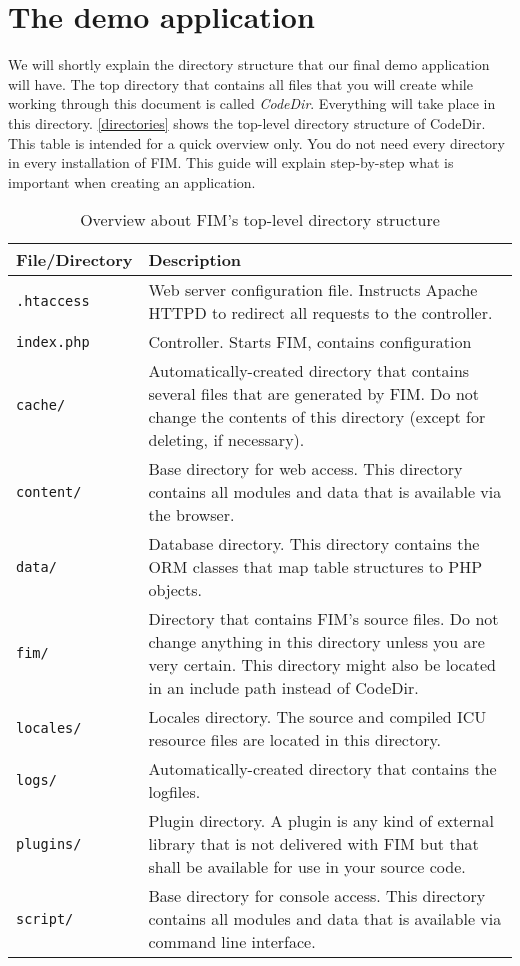 \documentclass{scrartcl}
\begin{document}
   \section{The demo application}
      We will shortly explain the directory structure that our final demo application will have. The top directory that contains all files that you will create while working through this document is called \emph{CodeDir}. Everything will take place in this directory. \autoref{directories} shows the top-level directory structure of CodeDir. This table is intended for a quick overview only. You do not need every directory in every installation of FIM. This guide will explain step-by-step what is important when creating an application.
      \begin{table}[htbp]
         \centering
         \begin{tabular}{p{2.5cm}||p{11.5cm}}
            File/Directory & Description \\\hline\hline
            \texttt{.htaccess} &
               Web server configuration file. Instructs Apache HTTPD to redirect all requests to the controller. \\\hline
            \texttt{index.php} &
               Controller. Starts FIM, contains configuration \\\hline
            \texttt{cache/} &
               Automatically-created directory that contains several files that are generated by FIM. Do not change the contents of this directory (except for deleting, if necessary). \\\hline
            \texttt{content/} &
               Base directory for web access. This directory contains all modules and data that is available via the browser. \\\hline
            \texttt{data/} &
               Database directory. This directory contains the ORM classes that map table structures to PHP objects. \\\hline
            \texttt{fim/} &
               Directory that contains FIM's source files. Do not change anything in this directory unless you are very certain. This directory might also be located in an include path instead of CodeDir. \\\hline
            \texttt{locales/} &
               Locales directory. The source and compiled ICU resource files are located in this directory. \\\hline
            \texttt{logs/} &
               Automatically-created directory that contains the logfiles. \\\hline
            \texttt{plugins/} &
               Plugin directory. A plugin is any kind of external library that is not delivered with FIM but that shall be available for use in your source code. \\\hline
            \texttt{script/} &
               Base directory for console access. This directory contains all modules and data that is available via command line interface.
         \end{tabular}
         \caption{Overview about FIM's top-level directory structure}
         \label{directories}
      \end{table}
\end{document}

